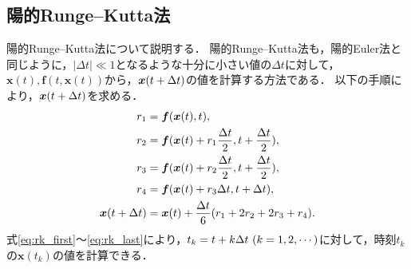 \subsection{陽的Runge--Kutta法}
陽的Runge--Kutta法について説明する．
陽的Runge--Kutta法も，陽的Euler法と同じように，$|\Delta t| \ll 1 $となるような十分に小さい値の$\Delta t$に対して，$\bm{x}(t),\bm{f}(t,\bm{x}(t))$から，$\bm{x}(t + \Delta t )$の値を計算する方法である．
以下の手順により，$\bm{x}(t + \Delta t)$を求める．
\begin{align}
    r_1 &= \bm{f}(\bm{x}(t),t), \label{eq:rk_first}\\
    r_2 &= \bm{f}(\bm{x}(t)+r_1 \frac{\Delta t}{2},t + \frac{\Delta t}{2}), \\
    r_3 &= \bm{f}(\bm{x}(t)+r_2 \frac{\Delta t}{2}, t + \frac{\Delta t}{2}), \\
    r_4 &= \bm{f}(\bm{x}(t)+r_3 \Delta t, t + \Delta t), \\
    \bm{x}(t + \Delta t) &= \bm{x}(t) + \frac{\Delta t}{6}(r_1 + 2r_2 + 2r_3 + r_4). \label{eq:rk_last}
\end{align}
式\eqref{eq:rk_first}〜\eqref{eq:rk_last}により，$t_k = t + k\Delta t \ (k = 1,2,\cdots)$に対して，時刻$t_k$の$\bm{x}(t_k)$の値を計算できる．


